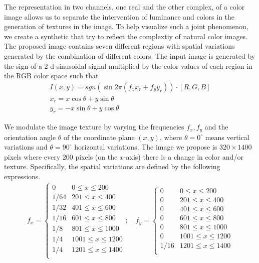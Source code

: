 The representation in two channels, one real and the other complex, of a color image allows us to separate the intervention of luminance and colors in the generation of textures in the image. To help visualize such a joint phenomenon, we create a synthetic that try to reflect the complextiy of natural color images. The proposed image contains seven different regions with spatial variations generated by the combination of different colors. The input image is generated by the sign of a 2-d sinusoidal signal multiplied by the color values of each region in the RGB color space such that  
\begin{gather}
	I(x, y) = sgn( \sin 2 \pi (f_x x_r + f_y y_r)) \cdot [R, G, B]\label{eq:2D_squared_signal}\\
	x_r = x \cos\theta + y \sin\theta \nonumber \\
    y_r = -x \sin\theta + y \cos\theta \nonumber  
\end{gather}

We modulate the image texture by varying the frequencies $f_{x}, f_{y}$ and the orientation angle $\theta$ of the coordinate plane $(x, y)$, where $\theta=0^\circ$ means vertical variations and $\theta=90^\circ$ horizontal variations. The image we propose is $320\times1400$ pixels where every 200 pixels (on the $x$-axis) there is a change in color and/or texture. Specifically, the spatial variations are defined by the following expressions. 
\begin{gather}
	f_{x} = 
	\begin{cases} 
      0    & 0\leq x\leq 200  \\
      1/64 & 201\leq x\leq 400  \\
      1/32 & 401\leq x\leq 600  \\
      1/16 & 601\leq x\leq 800  \\
      1/8  & 801\leq x\leq 1000  \\
      1/4  & 1001\leq x\leq 1200 \\   
      1/4  & 1201\leq x\leq 1400 \\ 
   	 \end{cases} \nonumber ; \quad
   	 f_{y} = \begin{cases} 
      0    & 0\leq x\leq 200  \\
      0    & 201\leq x\leq 400  \\
      0    & 401\leq x\leq 600  \\
      0    & 601\leq x\leq 800  \\
      0    & 801\leq x\leq 1000  \\
      0    & 1001\leq x\leq 1200 \\  
      1/16 & 1201\leq x\leq 1400 \\ 
   	 \end{cases} \nonumber  
\end{gather}


